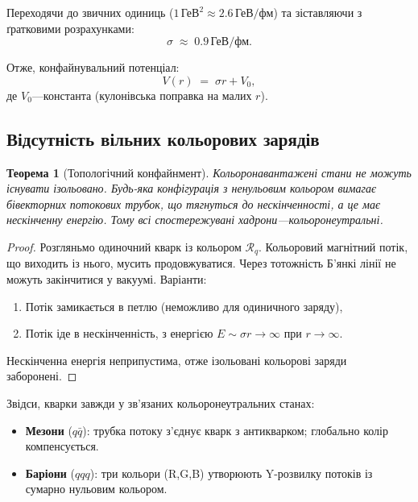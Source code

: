 \documentclass[11pt,a4paper]{article}
\newcommand{\Rotor}{\mathcal{R}}
\theoremstyle{definition}
\theoremstyle{plain}
\newtheorem{theorem}{Теорема}[section]
\theoremstyle{remark}
\begin{document}
Переходячи до звичних одиниць ($1\,\text{ГеВ}^2 \approx 2{.}6\,\text{ГеВ/фм}$) та зіставляючи з ґратковими розрахунками:
\begin{equation}
\boxed{\sigma \;\approx\; 0{.}9\,\text{ГеВ/фм}.}
\label{eq:string-tension}
\end{equation}

Отже, конфайнувальний потенціал:
\begin{equation}
V(r) \;=\; \sigma r + V_0,
\label{eq:linear-potential}
\end{equation}
де $V_0$—константа (кулонівська поправка на малих $r$).

\subsection{Відсутність вільних кольорових зарядів}

\begin{theorem}[Топологічний конфайнмент]
Кольоронавантажені стани не можуть існувати ізольовано. Будь-яка конфігурація з ненульовим кольором вимагає бівекторних потокових трубок, що тягнуться до нескінченності, а це має нескінченну енергію. Тому всі спостережувані хадрони—кольоронеутральні.
\end{theorem}

\begin{proof}
Розгляньмо одиночний кварк із кольором $\Rotor_q$. Кольоровий магнітний потік, що виходить із нього, мусить продовжуватися. Через тотожність Б’янкі лінії не можуть закінчитися у вакуумі. Варіанти:
\begin{enumerate}
  \item Потік замикається в петлю (неможливо для одиничного заряду),
  \item Потік іде в нескінченність, з енергією $E\sim\sigma r\to\infty$ при $r\to\infty$.
\end{enumerate}
Нескінченна енергія неприпустима, отже ізольовані кольорові заряди заборонені.
\end{proof}

Звідси, кварки завжди у зв’язаних кольоронеутральних станах:
\begin{itemize}[leftmargin=*,itemsep=3pt]
  \item \textbf{Мезони} ($q\bar{q}$): трубка потоку з’єднує кварк з антикварком; глобально колір компенсується.
  \item \textbf{Баріони} ($qqq$): три кольори (R,G,B) утворюють Y-розвилку потоків із сумарно нульовим кольором.
\end{itemize}
\end{document}
